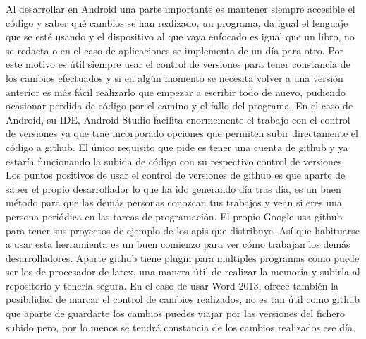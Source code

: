 Al desarrollar en Android una parte importante es mantener siempre accesible el código y saber qué cambios se han realizado, un programa, da igual el lenguaje que se esté usando y el dispositivo al que vaya enfocado es igual que un libro, no se redacta o en el caso de aplicaciones se implementa de un día para otro. Por este motivo es útil siempre usar el control de versiones para tener constancia de los cambios efectuados y si en algún momento se necesita volver a una versión anterior es más fácil realizarlo que empezar a escribir todo de nuevo, pudiendo ocasionar perdida de código por el camino y el fallo del programa.
En el caso de Android, su IDE, Android Studio facilita enormemente el trabajo con el control de versiones ya que trae incorporado opciones que permiten subir directamente el código a github. El único requisito que pide es tener una cuenta de github y ya estaría funcionando la subida de código con su respectivo control de versiones.
Los puntos positivos de usar el control de versiones de github es que aparte de saber el propio desarrollador lo que ha ido generando día tras día, es un buen método para que las demás personas conozcan tus trabajos y vean si eres una persona periódica en las tareas de programación.
El propio Google usa github para tener sus proyectos de ejemplo de los apis que distribuye. Así que habituarse a usar esta herramienta es un buen comienzo para ver cómo trabajan los demás desarrolladores.
Aparte github tiene plugin para multiples programas como puede ser los de procesador de latex, una manera útil de realizar la memoria y subirla al repositorio y tenerla segura.
En el caso de usar Word 2013, ofrece también la posibilidad de marcar el control de cambios realizados, no es tan útil como github que aparte de guardarte los cambios puedes viajar por las versiones del fichero subido pero, por lo menos se tendrá constancia de los cambios realizados ese día.

